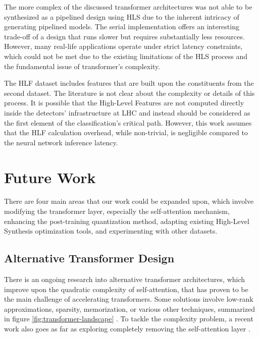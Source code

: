 The more complex of the discussed transformer architectures was not able to be synthesized as a pipelined design using HLS due to the inherent intricacy of generating pipelined models. The serial implementation offers an interesting trade-off of a design that runs slower but requires substantially less resources. However, many real-life applications operate under strict latency constraints, which could not be met due to the existing limitations of the HLS process and the fundamental issue of transformer's complexity.

The HLF dataset includes features that are built upon the constituents from the second dataset. The literature is not clear about the complexity or details of this process. It is possible that the High-Level Features are not computed directly inside the detectors' infrastructure at LHC and instead should be considered as the first element of the classification's critical path. However, this work assumes that the HLF calculation overhead, while non-trivial, is negligible compared to the neural network inference latency.

\section{Future Work}
There are four main areas that our work could be expanded upon, which involve modifying the transformer layer, especially the self-attention mechanism, enhancing the post-training quantization method, adapting existing High-Level Synthesis optimization tools, and experimenting with other datasets.

\subsection{Alternative Transformer Design}
There is an ongoing research into alternative transformer architectures, which improve upon the quadratic complexity of self-attention, that has proven to be the main challenge of accelerating transformers. Some solutions involve low-rank approximations, sparsity, memorization, or various other techniques, summarized in figure \ref{fig:transformer-landscape} \cite{81-tay2020efficient}. To tackle the complexity problem, a recent work also goes as far as exploring completely removing the self-attention layer \cite{82-mikuni2021point}.

